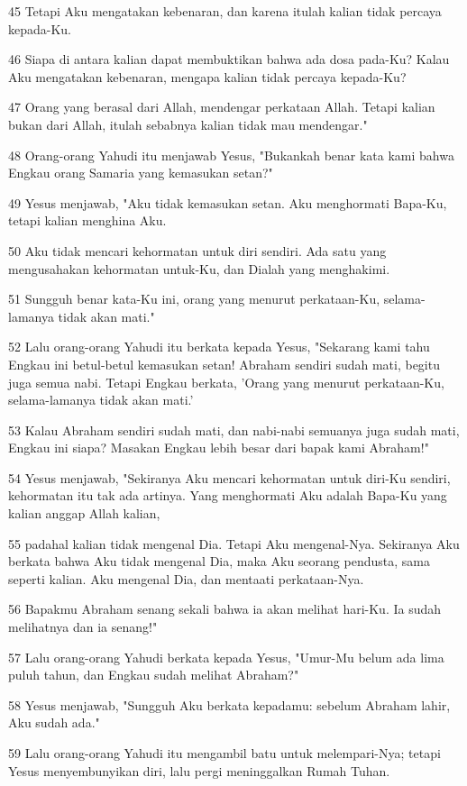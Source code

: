 \par 45 Tetapi Aku mengatakan kebenaran, dan karena itulah kalian tidak percaya kepada-Ku.
\par 46 Siapa di antara kalian dapat membuktikan bahwa ada dosa pada-Ku? Kalau Aku mengatakan kebenaran, mengapa kalian tidak percaya kepada-Ku?
\par 47 Orang yang berasal dari Allah, mendengar perkataan Allah. Tetapi kalian bukan dari Allah, itulah sebabnya kalian tidak mau mendengar."
\par 48 Orang-orang Yahudi itu menjawab Yesus, "Bukankah benar kata kami bahwa Engkau orang Samaria yang kemasukan setan?"
\par 49 Yesus menjawab, "Aku tidak kemasukan setan. Aku menghormati Bapa-Ku, tetapi kalian menghina Aku.
\par 50 Aku tidak mencari kehormatan untuk diri sendiri. Ada satu yang mengusahakan kehormatan untuk-Ku, dan Dialah yang menghakimi.
\par 51 Sungguh benar kata-Ku ini, orang yang menurut perkataan-Ku, selama-lamanya tidak akan mati."
\par 52 Lalu orang-orang Yahudi itu berkata kepada Yesus, "Sekarang kami tahu Engkau ini betul-betul kemasukan setan! Abraham sendiri sudah mati, begitu juga semua nabi. Tetapi Engkau berkata, 'Orang yang menurut perkataan-Ku, selama-lamanya tidak akan mati.'
\par 53 Kalau Abraham sendiri sudah mati, dan nabi-nabi semuanya juga sudah mati, Engkau ini siapa? Masakan Engkau lebih besar dari bapak kami Abraham!"
\par 54 Yesus menjawab, "Sekiranya Aku mencari kehormatan untuk diri-Ku sendiri, kehormatan itu tak ada artinya. Yang menghormati Aku adalah Bapa-Ku yang kalian anggap Allah kalian,
\par 55 padahal kalian tidak mengenal Dia. Tetapi Aku mengenal-Nya. Sekiranya Aku berkata bahwa Aku tidak mengenal Dia, maka Aku seorang pendusta, sama seperti kalian. Aku mengenal Dia, dan mentaati perkataan-Nya.
\par 56 Bapakmu Abraham senang sekali bahwa ia akan melihat hari-Ku. Ia sudah melihatnya dan ia senang!"
\par 57 Lalu orang-orang Yahudi berkata kepada Yesus, "Umur-Mu belum ada lima puluh tahun, dan Engkau sudah melihat Abraham?"
\par 58 Yesus menjawab, "Sungguh Aku berkata kepadamu: sebelum Abraham lahir, Aku sudah ada."
\par 59 Lalu orang-orang Yahudi itu mengambil batu untuk melempari-Nya; tetapi Yesus menyembunyikan diri, lalu pergi meninggalkan Rumah Tuhan.

